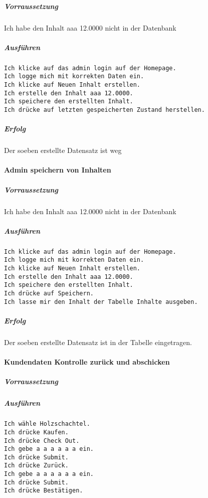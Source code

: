 \documentclass[a4paper, 11pt]{article}
\begin{document}
\subparagraph{Vorraussetzung}

Ich habe den Inhalt aaa 12.0000 nicht in der Datenbank

\subparagraph{Ausführen}

\begin{verbatim}
Ich klicke auf das admin login auf der Homepage.
Ich logge mich mit korrekten Daten ein.
Ich klicke auf Neuen Inhalt erstellen.
Ich erstelle den Inhalt aaa 12.0000.
Ich speichere den erstellten Inhalt.
Ich drücke auf letzten gespeicherten Zustand herstellen.
\end{verbatim}

\subparagraph{Erfolg}

Der soeben erstellte Datensatz ist weg

\paragraph{Admin speichern von Inhalten}

\subparagraph{Vorraussetzung}

Ich habe den Inhalt aaa 12.0000 nicht in der Datenbank

\subparagraph{Ausführen}

\begin{verbatim}
Ich klicke auf das admin login auf der Homepage.
Ich logge mich mit korrekten Daten ein.
Ich klicke auf Neuen Inhalt erstellen.
Ich erstelle den Inhalt aaa 12.0000.
Ich speichere den erstellten Inhalt.
Ich drücke auf Speichern.
Ich lasse mir den Inhalt der Tabelle Inhalte ausgeben.
\end{verbatim}

\subparagraph{Erfolg}

Der soeben erstellte Datensatz ist in der Tabelle eingetragen.

\paragraph{Kundendaten Kontrolle zurück und abschicken}

\subparagraph{Vorraussetzung}

\subparagraph{Ausführen}

\begin{verbatim}
Ich wähle Holzschachtel.
Ich drücke Kaufen.
Ich drücke Check Out.
Ich gebe a a a a a a ein.
Ich drücke Submit.
Ich drücke Zurück.
Ich gebe a a a a a a ein.
Ich drücke Submit.
Ich drücke Bestätigen.
\end{verbatim}
\end{document}
